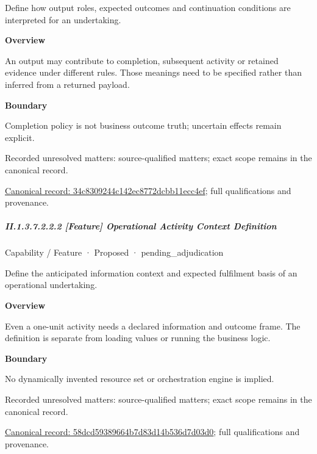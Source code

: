 Define how output roles, expected outcomes and continuation conditions are interpreted for an undertaking.



\textbf{Overview}



An output may contribute to completion, subsequent activity or retained evidence under different rules. Those meanings need to be specified rather than inferred from a returned payload.



\textbf{Boundary}



Completion policy is not business outcome truth; uncertain effects remain explicit.


{\small Recorded unresolved matters: source-qualified matters; exact scope remains in the canonical record.}\par
{\footnotesize \href{../../../../../../../continuum/strategy/capability/feature/34c8309244c142ec8772dcbb11ecc4ef.md}{Canonical record: 34c8309244c142ec8772dcbb11ecc4ef}; full qualifications and provenance.}\par
\subparagraph*{II.1.3.7.2.2.2 [Feature] Operational Activity Context Definition}
\label{navigation:II.1.3.7.2.2.2}

\label{element:58dcd59389664b7d83d14b536d7d03d0}
{\small Capability / Feature · Proposed · pending\_adjudication}\par

Define the anticipated information context and expected fulfilment basis of an operational undertaking.



\textbf{Overview}



Even a one-unit activity needs a declared information and outcome frame. The definition is separate from loading values or running the business logic.



\textbf{Boundary}



No dynamically invented resource set or orchestration engine is implied.


{\small Recorded unresolved matters: source-qualified matters; exact scope remains in the canonical record.}\par
{\footnotesize \href{../../../../../../../continuum/strategy/capability/feature/58dcd59389664b7d83d14b536d7d03d0.md}{Canonical record: 58dcd59389664b7d83d14b536d7d03d0}; full qualifications and provenance.}\par
